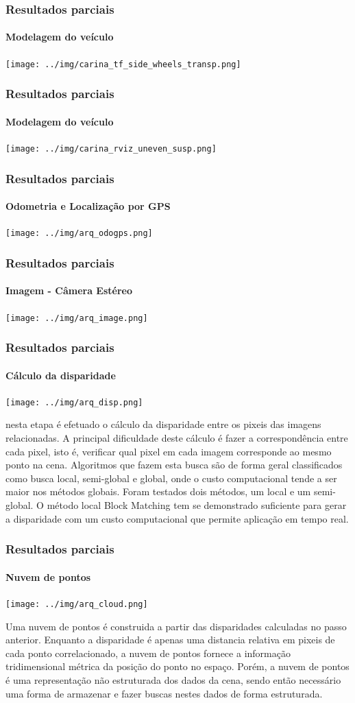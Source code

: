 \documentclass{article}
\begin{document}
\begin{frame}
\frametitle{Resultados parciais}
\framesubtitle{Modelagem do veículo}
\texttt{[image: ../img/carina\_tf\_side\_wheels\_transp.png]}
\end{frame}

\begin{frame}
\frametitle{Resultados parciais}
\framesubtitle{Modelagem do veículo}
\texttt{[image: ../img/carina\_rviz\_uneven\_susp.png]}
\end{frame}


\begin{frame}
\frametitle{Resultados parciais}
\framesubtitle{Odometria e Localização por GPS}
\texttt{[image: ../img/arq\_odogps.png]}
\end{frame}


\begin{frame}
\frametitle{Resultados parciais}
\framesubtitle{Imagem - Câmera Estéreo}
\texttt{[image: ../img/arq\_image.png]}
\end{frame}

\begin{frame}
\frametitle{Resultados parciais}
\framesubtitle{Cálculo da disparidade}
\texttt{[image: ../img/arq\_disp.png]}
\end{frame}

nesta etapa é efetuado o cálculo da disparidade entre os pixeis das imagens
relacionadas. A principal dificuldade deste cálculo é fazer a correspondência
entre cada pixel, isto é, verificar qual pixel em cada imagem
corresponde ao mesmo ponto na cena. Algoritmos que fazem esta busca são de forma
geral classificados como busca local, semi-global e global, onde o custo
computacional tende a ser maior nos métodos globais. Foram testados dois
métodos, um local e um semi-global. O método local Block Matching tem se
demonstrado suficiente para gerar a disparidade com um custo computacional que
permite aplicação em tempo real. 

\begin{frame}
\frametitle{Resultados parciais}
\framesubtitle{Nuvem de pontos}
\texttt{[image: ../img/arq\_cloud.png]}
\end{frame}

Uma nuvem de pontos é construida a partir das disparidades calculadas no passo
anterior. Enquanto a disparidade é apenas uma distancia relativa em pixeis de
cada ponto correlacionado, a nuvem de pontos fornece a informação tridimensional
métrica da posição do ponto no espaço. Porém, a nuvem de pontos é uma
representação não estruturada dos dados da cena, sendo então necessário uma
forma de armazenar e fazer buscas nestes dados de forma estruturada.
\end{document}
